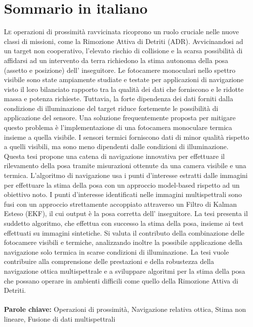 
\chapter*{Sommario in italiano}
\thispagestyle{empty}

\lettrine{L}{e} operazioni di prossimità ravvicinata ricoprono un ruolo cruciale nelle nuove classi di missioni, come la Rimozione Attiva di Detriti (ADR). Avvicinandosi ad un target non cooperativo, l'elevato rischio di collisione e la scarsa possibilità di affidarsi ad un intervento da terra richiedono la stima autonoma della posa (assetto e posizione) dell' inseguitore. Le fotocamere monoculari nello spettro visibile sono state ampiamente studiate e testate per applicazioni di navigazione visto il loro bilanciato rapporto tra la qualità dei dati che forniscono e le ridotte massa e potenza richieste. Tuttavia, la forte dipendenza dei dati forniti dalla condizione di illuminazione del target riduce fortemente le possibilità di applicazione del sensore. Una soluzione frequentemente proposta per mitigare questo problema è l'implementazione di una fotocamera monoculare termica insieme a quella visibile. I sensori termici forniscono dati di minor qualità rispetto a quelli visibili, ma sono meno dipendenti dalle condizioni di illuminazione.
Questa tesi propone una catena di navigazione innovativa per effettuare il rilevamento della posa tramite misurazioni ottenute da una camera visibile e una termica. L'algoritmo di navigazione usa i punti d'interesse estratti dalle immagini per effettuare la stima della posa con un approccio model-based rispetto ad un obiettivo noto. I punti d'interesse identificati nelle immagini multispettrali sono fusi con un approccio strettamente accoppiato attraverso un Filtro di Kalman Esteso (EKF), il cui output è la posa corretta dell' inseguitore. La tesi presenta il suddetto algoritmo, che effettua con successo la stima della posa, insieme ai test effettuati su immagini sintetiche. Si valuta il contributo della combinazione delle fotocamere visibili e termiche, analizzando inoltre la possibile applicazione della navigazione solo termica in scarse condizioni di illuminazione. La tesi vuole contribuire alla comprensione delle prestazioni e della robustezza della navigazione ottica multispettrale e a sviluppare algoritmi per la stima della posa che possano operare in ambienti difficili come quello della Rimozione Attiva di Detriti.
\\ \mbox{}\\ \noindent
\textbf{Parole chiave:} Operazioni di prossimità, Navigazione relativa ottica,  Stima non lineare, Fusione di dati multispettrali